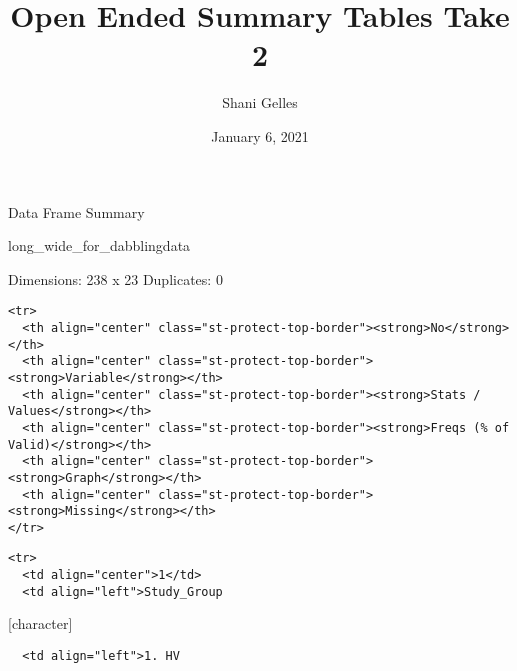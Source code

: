\documentclass[]{article}
\title{Open Ended Summary Tables Take 2}
\author{Shani Gelles}
\date{January 6, 2021}
\begin{document}
\maketitle

Data Frame Summary

long\_wide\_for\_dabblingdata

Dimensions: 238 x 23 Duplicates: 0

\begin{verbatim}
<tr>
  <th align="center" class="st-protect-top-border"><strong>No</strong></th>
  <th align="center" class="st-protect-top-border"><strong>Variable</strong></th>
  <th align="center" class="st-protect-top-border"><strong>Stats / Values</strong></th>
  <th align="center" class="st-protect-top-border"><strong>Freqs (% of Valid)</strong></th>
  <th align="center" class="st-protect-top-border"><strong>Graph</strong></th>
  <th align="center" class="st-protect-top-border"><strong>Missing</strong></th>
</tr>
\end{verbatim}

\begin{verbatim}
<tr>
  <td align="center">1</td>
  <td align="left">Study_Group
\end{verbatim}

{[}character{]}

\begin{verbatim}
  <td align="left">1. HV
\end{verbatim}
\end{document}
